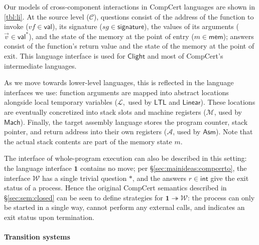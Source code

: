 \documentclass[sigplan,screen]{acmart}
\newcommand{\kw}[1]{\ensuremath{ \mathsf{#1} }}
\begin{document}
Our models of cross-component interactions in CompCert languages
are shown in \autoref{tbl:li}.
At the source level ($\mathcal{C}$),
questions consist of
the address of the function to invoke
($\mathit{vf} \in \kw{val}$),
its signature
($\mathit{sg} \in \kw{signature}$),
the values of its arguments
($\vec{v} \in \kw{val}^*$),
and the state of the memory at the point of entry
($m \in \kw{mem}$);
answers
consist of the function's return value
and the state of the memory at the point of exit.
This language interface is used for \kw{Clight} and
most of CompCert's intermediate languages.

As we move towards lower-level languages,
this is reflected in the language interfaces we use:
function arguments are mapped into
abstract locations alongside local temporary variables
($\mathcal{L}$,~used by \kw{LTL} and \kw{Linear}).
These locations are eventually concretized into
stack slots and machine registers
($\mathcal{M}$, used by \kw{Mach}).
Finally, the target assembly language
stores the program counter, stack pointer,
and return address into their own registers
($\mathcal{A}$, used by $\kw{Asm}$).
Note that the actual stack contents
are part of the memory state $m$.

The interface of whole-program execution
can also be described in this setting:
the language interface $\mathbf{1}$ contains no move;
per \S\ref{sec:mainideas:compcerto},
the interface $\mathcal{W}$ has a single trivial question $*$,
and the answers $r \in \kw{int}$
give the exit status of a process.
Hence the original CompCert semantics described in
\S\ref{sec:sem:closed}
can be seen to define strategies for
$\mathbf{1} \twoheadrightarrow \mathcal{W}$:
the process can only be started in a single way,
cannot perform any external calls,
and indicates an exit status upon termination.


\paragraph{Transition systems} %
\end{document}
